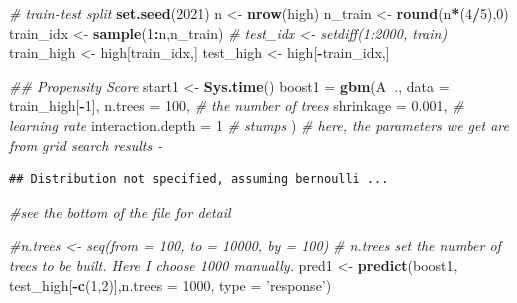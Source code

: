 \documentclass[]{article}
\newenvironment{Shaded}{\begin{snugshade}}{\end{snugshade}}
\newcommand{\CommentTok}[1]{\textcolor[rgb]{0.56,0.35,0.01}{\textit{#1}}}
\newcommand{\DataTypeTok}[1]{\textcolor[rgb]{0.13,0.29,0.53}{#1}}
\newcommand{\DecValTok}[1]{\textcolor[rgb]{0.00,0.00,0.81}{#1}}
\newcommand{\FloatTok}[1]{\textcolor[rgb]{0.00,0.00,0.81}{#1}}
\newcommand{\KeywordTok}[1]{\textcolor[rgb]{0.13,0.29,0.53}{\textbf{#1}}}
\newcommand{\NormalTok}[1]{#1}
\newcommand{\OperatorTok}[1]{\textcolor[rgb]{0.81,0.36,0.00}{\textbf{#1}}}
\newcommand{\StringTok}[1]{\textcolor[rgb]{0.31,0.60,0.02}{#1}}
\begin{document}
\begin{Shaded}
\begin{Highlighting}[]
\CommentTok{# train-test split}
\KeywordTok{set.seed}\NormalTok{(}\DecValTok{2021}\NormalTok{)}
\NormalTok{n <-}\StringTok{ }\KeywordTok{nrow}\NormalTok{(high)}
\NormalTok{n_train <-}\StringTok{ }\KeywordTok{round}\NormalTok{(n}\OperatorTok{*}\NormalTok{(}\DecValTok{4}\OperatorTok{/}\DecValTok{5}\NormalTok{),}\DecValTok{0}\NormalTok{)}
\NormalTok{train_idx <-}\StringTok{ }\KeywordTok{sample}\NormalTok{(}\DecValTok{1}\OperatorTok{:}\NormalTok{n,n_train)}
\CommentTok{# test_idx <- setdiff(1:2000, train)}
\NormalTok{train_high <-}\StringTok{ }\NormalTok{high[train_idx,]}
\NormalTok{test_high <-}\StringTok{ }\NormalTok{high[}\OperatorTok{-}\NormalTok{train_idx,]}

\CommentTok{## Propensity Score}
\NormalTok{start1 <-}\StringTok{ }\KeywordTok{Sys.time}\NormalTok{()}
\NormalTok{boost1 =}\StringTok{ }\KeywordTok{gbm}\NormalTok{(A}\OperatorTok{~}\NormalTok{., }\DataTypeTok{data =}\NormalTok{ train_high[}\OperatorTok{-}\DecValTok{1}\NormalTok{], }
            \DataTypeTok{n.trees =} \DecValTok{100}\NormalTok{, }\CommentTok{# the number of trees}
            \DataTypeTok{shrinkage =} \FloatTok{0.001}\NormalTok{, }\CommentTok{# learning rate}
            \DataTypeTok{interaction.depth =} \DecValTok{1} \CommentTok{# stumps}
\NormalTok{            ) }\CommentTok{# here, the parameters we get are from grid search results - }
\end{Highlighting}
\end{Shaded}

\begin{verbatim}
## Distribution not specified, assuming bernoulli ...
\end{verbatim}

\begin{Shaded}
\begin{Highlighting}[]
              \CommentTok{#see the bottom of the file for detail}

\CommentTok{#n.trees <- seq(from = 100, to = 10000, by = 100)}
\CommentTok{# n.trees set the number of trees to be built. Here I choose 1000 manually.}
\NormalTok{pred1 <-}\StringTok{ }\KeywordTok{predict}\NormalTok{(boost1, test_high[}\OperatorTok{-}\KeywordTok{c}\NormalTok{(}\DecValTok{1}\NormalTok{,}\DecValTok{2}\NormalTok{)],}\DataTypeTok{n.trees =} \DecValTok{1000}\NormalTok{, }\DataTypeTok{type =} \StringTok{'response'}\NormalTok{)}
\end{Highlighting}
\end{Shaded}
\end{document}
